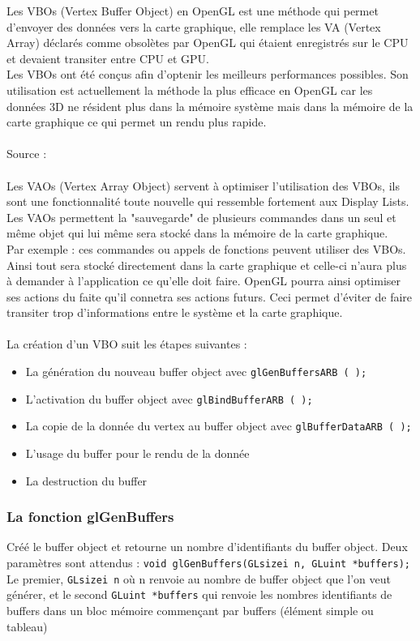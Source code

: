 
Les VBOs (Vertex Buffer Object) en OpenGL est une méthode qui permet d'envoyer des données vers la carte graphique, elle remplace les VA (Vertex Array) déclarés comme obsolètes par OpenGL qui étaient enregistrés sur le CPU et devaient transiter entre CPU et GPU.\\
Les VBOs ont été conçus afin d'optenir les meilleurs performances possibles. Son utilisation est actuellement la méthode la plus efficace en OpenGL car les données 3D ne résident plus dans la mémoire système mais dans la mémoire de la carte graphique ce qui permet un rendu plus rapide.
\\\\
Source : \cite{VBO}
\\\\
Les VAOs (Vertex Array Object) servent à optimiser l'utilisation des VBOs, ils sont une fonctionnalité toute nouvelle qui ressemble fortement aux Display Lists. Les VAOs permettent la "sauvegarde" de plusieurs commandes dans un seul et même objet qui lui même sera stocké dans la mémoire de la carte graphique. \\
Par exemple : ces commandes ou appels de fonctions peuvent utiliser des VBOs. Ainsi tout sera stocké directement dans la carte graphique et celle-ci n'aura plus à demander à l'application ce qu'elle doit faire. OpenGL pourra ainsi optimiser ses actions du faite qu'il connetra ses actions futurs. Ceci permet d'éviter de faire transiter trop d'informations entre le système et la carte graphique.\\\\
La création d’un VBO suit les étapes suivantes : 
\begin{itemize}
\item La génération du nouveau buffer object avec \verb|glGenBuffersARB ( );|
\item L’activation du buffer object avec \verb|glBindBufferARB ( );|
\item La copie de la donnée du vertex au buffer object avec \verb|glBufferDataARB ( );| 
\item L’usage du buffer pour le rendu de la donnée
\item La destruction du buffer
\end{itemize}
\subsubsection*{La fonction glGenBuffers} 
Créé le buffer object et retourne un nombre d’identifiants du buffer object. Deux paramètres sont attendus : 
\verb|void glGenBuffers(GLsizei n, GLuint *buffers);|
\\
Le premier, \verb|GLsizei n| où n renvoie au nombre de buffer object que l’on veut générer, et le second \verb|GLuint *buffers| qui renvoie les nombres identifiants de buffers dans un bloc mémoire commençant par buffers (élément simple ou tableau)

